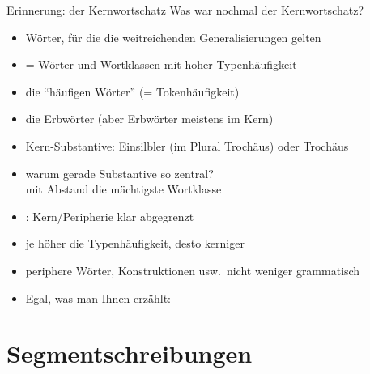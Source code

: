 \begin{frame}
  {Erinnerung: der Kernwortschatz}
  \pause
  Was war nochmal der Kernwortschatz?\\
  \Halbzeile
  \pause
  \begin{itemize}[<+->]
    \item Wörter, für die \alert{die weitreichenden Generalisierungen gelten}
    \item = Wörter und Wortklassen mit \alert{hoher Typenhäufigkeit}
    \item {} die "`häufigen Wörter"' (= Tokenhäufigkeit)
    \item {} die Erbwörter (aber Erbwörter meistens im Kern)
      \Halbzeile
    \item Kern-Substantive: Einsilbler (im Plural Trochäus) oder Trochäus
    \item warum gerade Substantive so zentral?\\
      \alert{mit Abstand die mächtigste Wortklasse}
      \Halbzeile
    \item {}: Kern\slash Peripherie klar abgegrenzt
    \item je höher die Typenhäufigkeit, desto kerniger
    \item periphere Wörter, Konstruktionen usw.\ \alert{nicht weniger grammatisch}
      \Halbzeile
    \item Egal, was man Ihnen erzählt: 
  \end{itemize}
\end{frame}

\section{Segment\-schreibungen}

